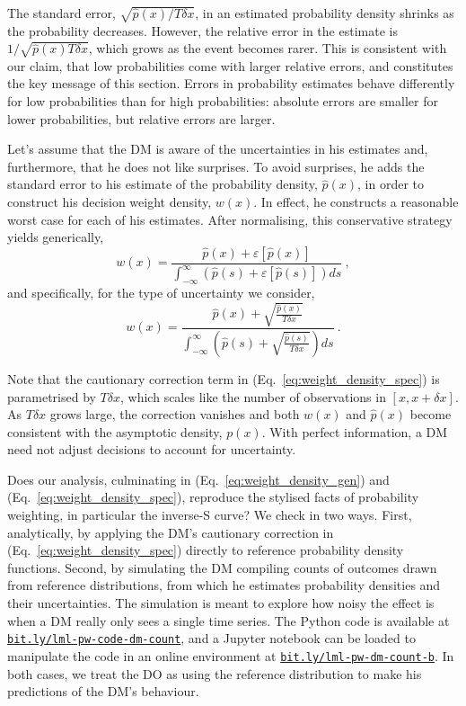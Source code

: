 \documentclass[a4paper, 12pt]{article}
\newcommand{\elabel}[1]{\label{eq:#1}}
\newcommand{\eref}[1]{(Eq.~\ref{eq:#1})}
\newcommand{\be}{\begin{equation}}
\newcommand{\ee}{\end{equation}}
\newcommand{\err}[1]{\varepsilon\left[#1\right]}
\newcommand{\phat}{\hat{p}}
\begin{document}
The standard error, $ \sqrt{\phat(x)/T \delta x}$, in an estimated probability density shrinks as the probability decreases. However, the relative error in the estimate is $1/\sqrt{\phat(x)T\delta x}$, which grows as the event becomes rarer. This is consistent with our claim, that low probabilities come with larger relative errors, and constitutes the key message of this section. Errors in probability estimates behave differently for low probabilities than for high probabilities: absolute errors are smaller for lower probabilities, but relative errors are larger.

Let's assume that the DM is aware of the uncertainties in his estimates and, furthermore, that he does not like surprises. To avoid surprises, he adds the standard error to his estimate of the probability density, $\phat(x)$, in order to construct his decision weight density, $w(x)$. In effect, he constructs a reasonable worst case for each of his estimates. After normalising, this conservative strategy yields generically,
\be
w(x) = \frac{\phat(x)+\err{\phat(x)}}{\int_{-\infty}^{\infty}\left(\phat(s)+\err{\phat(s)}\right)ds}~,
\elabel{weight_density_gen}
\ee
and specifically, for the type of uncertainty we consider,
\be
w(x)= \frac{\phat(x)+\sqrt{\frac{\phat(x)}{T \delta x}}}{\int_{-\infty}^{\infty}\left(\phat(s)+\sqrt{\frac{\phat(s)}{T \delta x}}\right)ds}~.
\elabel{weight_density_spec}
\ee

Note that the cautionary correction term in \eref{weight_density_spec} is parametrised by $T\delta x$, which scales like the number of observations in $[x, x+\delta x]$. As $T\delta x$ grows large, the correction vanishes and both $w(x)$ and $\phat(x)$ become consistent with the asymptotic density, $p(x)$. With perfect information, a DM need not adjust decisions to account for uncertainty.

Does our analysis, culminating in \eref{weight_density_gen} and \eref{weight_density_spec}, reproduce the stylised facts of probability weighting, in particular the inverse-S curve? We check in two ways. First, analytically, by applying the DM's cautionary correction in \eref{weight_density_spec} directly to reference probability density functions. Second, by simulating the DM compiling counts of outcomes drawn from reference distributions, from which he estimates probability densities and their uncertainties. The simulation is meant to explore how noisy the effect is when a DM really only sees a single time series. The Python code is available at \href{https://bit.ly/lml-pw-code-dm-count}{\texttt{bit.ly/lml-pw-code-dm-count}}, and a Jupyter notebook can be loaded to manipulate the code in an online environment at \href{https://bit.ly/lml-pw-dm-count-b}{\texttt{bit.ly/lml-pw-dm-count-b}}. In both cases, we treat the DO as using the reference distribution to make his predictions of the DM's behaviour.
\end{document}
